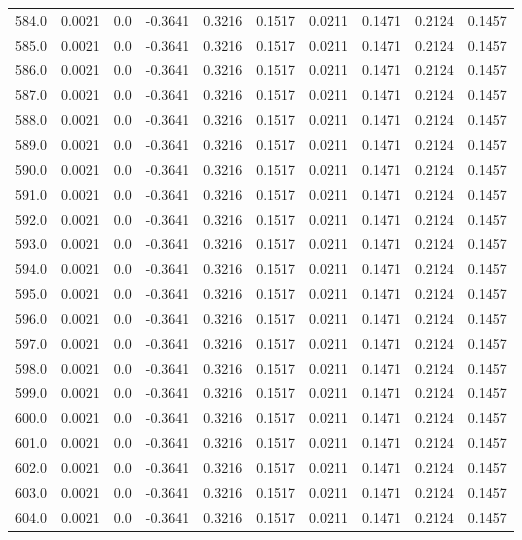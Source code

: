 \begin{longtable}{lrrrrrrrrr}
584.0 & 0.0021 & 0.0 & -0.3641 & 0.3216 & 0.1517 & 0.0211 & 0.1471 & 0.2124 & 0.1457 \\
585.0 & 0.0021 & 0.0 & -0.3641 & 0.3216 & 0.1517 & 0.0211 & 0.1471 & 0.2124 & 0.1457 \\
586.0 & 0.0021 & 0.0 & -0.3641 & 0.3216 & 0.1517 & 0.0211 & 0.1471 & 0.2124 & 0.1457 \\
587.0 & 0.0021 & 0.0 & -0.3641 & 0.3216 & 0.1517 & 0.0211 & 0.1471 & 0.2124 & 0.1457 \\
588.0 & 0.0021 & 0.0 & -0.3641 & 0.3216 & 0.1517 & 0.0211 & 0.1471 & 0.2124 & 0.1457 \\
589.0 & 0.0021 & 0.0 & -0.3641 & 0.3216 & 0.1517 & 0.0211 & 0.1471 & 0.2124 & 0.1457 \\
590.0 & 0.0021 & 0.0 & -0.3641 & 0.3216 & 0.1517 & 0.0211 & 0.1471 & 0.2124 & 0.1457 \\
591.0 & 0.0021 & 0.0 & -0.3641 & 0.3216 & 0.1517 & 0.0211 & 0.1471 & 0.2124 & 0.1457 \\
592.0 & 0.0021 & 0.0 & -0.3641 & 0.3216 & 0.1517 & 0.0211 & 0.1471 & 0.2124 & 0.1457 \\
593.0 & 0.0021 & 0.0 & -0.3641 & 0.3216 & 0.1517 & 0.0211 & 0.1471 & 0.2124 & 0.1457 \\
594.0 & 0.0021 & 0.0 & -0.3641 & 0.3216 & 0.1517 & 0.0211 & 0.1471 & 0.2124 & 0.1457 \\
595.0 & 0.0021 & 0.0 & -0.3641 & 0.3216 & 0.1517 & 0.0211 & 0.1471 & 0.2124 & 0.1457 \\
596.0 & 0.0021 & 0.0 & -0.3641 & 0.3216 & 0.1517 & 0.0211 & 0.1471 & 0.2124 & 0.1457 \\
597.0 & 0.0021 & 0.0 & -0.3641 & 0.3216 & 0.1517 & 0.0211 & 0.1471 & 0.2124 & 0.1457 \\
598.0 & 0.0021 & 0.0 & -0.3641 & 0.3216 & 0.1517 & 0.0211 & 0.1471 & 0.2124 & 0.1457 \\
599.0 & 0.0021 & 0.0 & -0.3641 & 0.3216 & 0.1517 & 0.0211 & 0.1471 & 0.2124 & 0.1457 \\
600.0 & 0.0021 & 0.0 & -0.3641 & 0.3216 & 0.1517 & 0.0211 & 0.1471 & 0.2124 & 0.1457 \\
601.0 & 0.0021 & 0.0 & -0.3641 & 0.3216 & 0.1517 & 0.0211 & 0.1471 & 0.2124 & 0.1457 \\
602.0 & 0.0021 & 0.0 & -0.3641 & 0.3216 & 0.1517 & 0.0211 & 0.1471 & 0.2124 & 0.1457 \\
603.0 & 0.0021 & 0.0 & -0.3641 & 0.3216 & 0.1517 & 0.0211 & 0.1471 & 0.2124 & 0.1457 \\
604.0 & 0.0021 & 0.0 & -0.3641 & 0.3216 & 0.1517 & 0.0211 & 0.1471 & 0.2124 & 0.1457 \\

\end{longtable}
